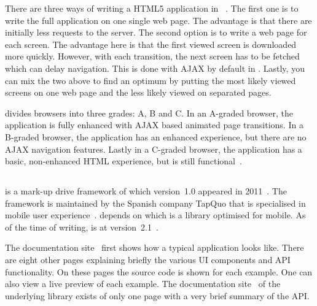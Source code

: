 \documentclass[a4paper]{artikel3}
\newcommand{\term}[1]{\emph{#1}}
\newcommand{\setspace}[0]{\vspace{2mm}}
\renewcommand{\paragraph}[1]{\setspace \noindent {\bf #1}  }
\begin{document}
There are three ways of writing a HTML5 application in \jqma{}~\cite{Broulik2012}. 
The first one is to write the full application on one single web page.
The advantage is that there are initially less requests to the server.
The second option is to write a web page for each screen. 
The advantage here is that the first viewed screen is downloaded more quickly. 
However, with each transition, the next screen has to be fetched which can delay navigation.
This is done with AJAX by default in \jqma{}.
Lastly, you can mix the two above to find an optimum by putting the most likely viewed screens on one web page and the less likely viewed on separated pages.  

\paragraph{Browser support}
\label{sec:jqm-browser-support}
\jqma{} divides browsers into three grades: A, B and C. 
In an A-graded browser, the application is fully enhanced with AJAX based animated page transitions.
In a B-graded browser, the application has an enhanced experience, but there are no AJAX navigation features.
Lastly in a C-graded browser, the application has a basic, non-enhanced HTML experience, but is still functional~\cite{JQuery2012d}.


\subsection{\lungo} %
\label{sec:frameworks-lungo}

\lungo{} is a mark-up drive framework of which version~1.0 appeared in 2011~\cite{TapQuo2011}.
The framework is maintained by the Spanish company TapQuo that is specialised in mobile user experience~\cite{TapQuo2013a}.
\lungo{} depends on  \quo{} which is a \js{} library optimised for mobile.
As of the time of writing, \lungo{} is at version~2.1~\cite{TapQuo2013}.

\paragraph{Documentation}
The documentation site~\cite{Lungo2013} first shows how a typical \lungo{} application looks like.
There are eight other pages explaining briefly the various UI components and API functionality.
On these pages the source code is shown for each example.
One can also view a live preview of each example.
The documentation site~\cite{TapQuo2013c} of the underlying \js{} library exists of only one page with a very brief summary of the API.
\end{document}

